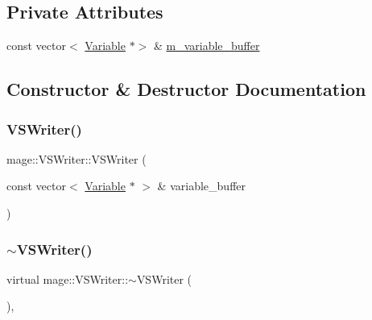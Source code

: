 \subsection*{Private Attributes}
\begin{DoxyCompactItemize}
\item 
const vector$<$ \hyperlink{structmage_1_1_variable}{Variable} $\ast$$>$ \& \hyperlink{classmage_1_1_v_s_writer_a4fa655fa7c7d09a9439a22061ceab0f4}{m\+\_\+variable\+\_\+buffer}
\end{DoxyCompactItemize}


\subsection{Constructor \& Destructor Documentation}
\hypertarget{classmage_1_1_v_s_writer_a401e3661cf197c20a011792221443e8f}{}\label{classmage_1_1_v_s_writer_a401e3661cf197c20a011792221443e8f} 
\subsubsection{\texorpdfstring{V\+S\+Writer()}{VSWriter()}\hspace{0.1cm}{\footnotesize\ttfamily [1/2]}}
{\footnotesize\ttfamily mage\+::\+V\+S\+Writer\+::\+V\+S\+Writer (\begin{DoxyParamCaption}\item[{const vector$<$ \hyperlink{structmage_1_1_variable}{Variable} $\ast$ $>$ \&}]{variable\+\_\+buffer }\end{DoxyParamCaption})}

\hypertarget{classmage_1_1_v_s_writer_ac2268dde1a58f0d1d657e584e33e82fe}{}\label{classmage_1_1_v_s_writer_ac2268dde1a58f0d1d657e584e33e82fe} 
\subsubsection{\texorpdfstring{$\sim$\+V\+S\+Writer()}{~VSWriter()}}
{\footnotesize\ttfamily virtual mage\+::\+V\+S\+Writer\+::$\sim$\+V\+S\+Writer (\begin{DoxyParamCaption}{ }\end{DoxyParamCaption})\hspace{0.3cm}{\ttfamily [virtual]}, {\ttfamily [default]}}

